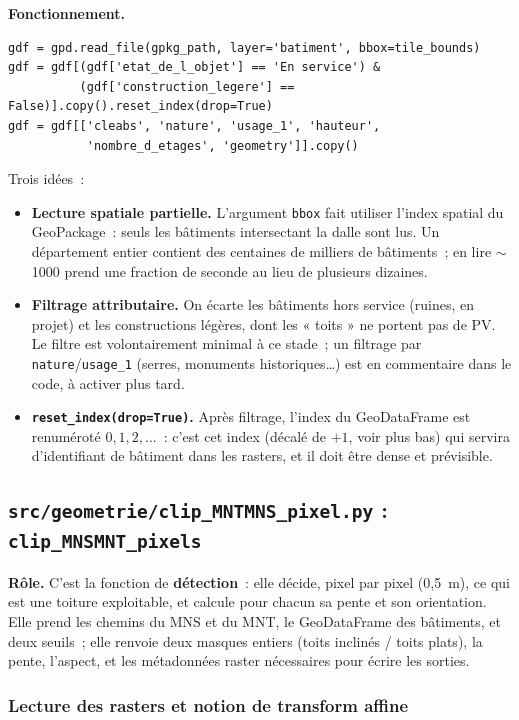 \documentclass[11pt,a4paper]{article}
\newcommand{\fichier}[1]{\texttt{#1}}
\newcommand{\fonction}[1]{\texttt{#1}}
\begin{document}
\textbf{Fonctionnement.}
\begin{lstlisting}
gdf = gpd.read_file(gpkg_path, layer='batiment', bbox=tile_bounds)
gdf = gdf[(gdf['etat_de_l_objet'] == 'En service') &
          (gdf['construction_legere'] == False)].copy().reset_index(drop=True)
gdf = gdf[['cleabs', 'nature', 'usage_1', 'hauteur',
           'nombre_d_etages', 'geometry']].copy()
\end{lstlisting}

Trois idées~:
\begin{itemize}
  \item \textbf{Lecture spatiale partielle.} L'argument \fonction{bbox} fait
    utiliser l'index spatial du GeoPackage~: seuls les bâtiments intersectant la
    dalle sont lus. Un département entier contient des centaines de milliers de
    bâtiments~; en lire $\sim$1000 prend une fraction de seconde au lieu de
    plusieurs dizaines.
  \item \textbf{Filtrage attributaire.} On écarte les bâtiments hors service
    (ruines, en projet) et les constructions légères, dont les « toits » ne
    portent pas de PV. Le filtre est volontairement minimal à ce stade~; un
    filtrage par \fichier{nature}/\fichier{usage\_1} (serres, monuments
    historiques\ldots) est en commentaire dans le code, à activer plus tard.
  \item \textbf{\fonction{reset\_index(drop=True)}.} Après filtrage, l'index du
    GeoDataFrame est renuméroté $0, 1, 2, \ldots$~: c'est cet index (décalé de
    $+1$, voir plus bas) qui servira d'identifiant de bâtiment dans les rasters,
    et il doit être dense et prévisible.
\end{itemize}

\subsection{\fichier{src/geometrie/clip\_MNTMNS\_pixel.py} : \fonction{clip\_MNSMNT\_pixels}}
\label{sec:clip}

\textbf{Rôle.} C'est la fonction de \textbf{détection}~: elle décide, pixel par
pixel (0,5~m), ce qui est une toiture exploitable, et calcule pour chacun sa
pente et son orientation. Elle prend les chemins du MNS et du MNT, le
GeoDataFrame des bâtiments, et deux seuils~; elle renvoie deux masques entiers
(toits inclinés / toits plats), la pente, l'aspect, et les métadonnées raster
nécessaires pour écrire les sorties.

\subsubsection{Lecture des rasters et notion de transform affine}
\end{document}
